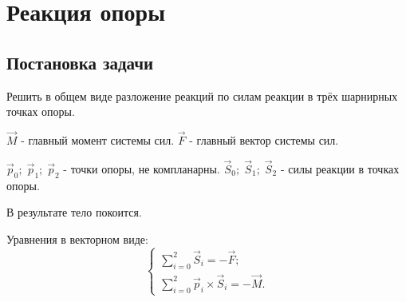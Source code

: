 \section{Реакция опоры}
\subsection{Постановка задачи}
Решить в общем виде разложение реакций по силам реакции в трёх шарнирных точках опоры.

$\vec{M}$ - главный момент системы сил.
$\vec{F}$ - главный вектор системы сил.

$\vec{p}_0;\;\vec{p}_1;\;\vec{p}_2$ - точки опоры, не компланарны.
$\vec{S}_0;\;\vec{S}_1;\;\vec{S}_2$ - силы реакции в точках опоры.

В результате тело покоится.

Уравнения в векторном виде:
\begin{equation}
\left\{
	\begin{array}{l}
	\sum\limits_{i=0}^2 \vec{S}_i = -\vec{F};\\
	\sum\limits_{i=0}^2 \vec{p}_i \times \vec{S}_i = -\vec{M}.
	\end{array}
\right.	
\end{equation}


